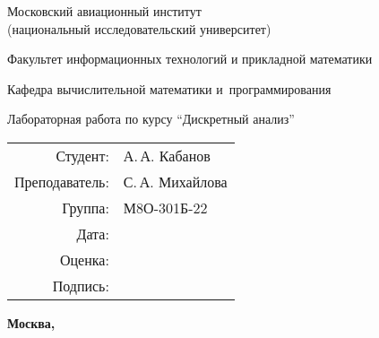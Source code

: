 \begin{titlepage}
	\begin{center}
		\bfseries
		
		{\Large Московский авиационный институт\\ (национальный исследовательский университет)
			
		}
		
		\vspace{48pt}
		
		{\large Факультет информационных технологий и прикладной математики
		}
		
		\vspace{36pt}
		
		{\large Кафедра вычислительной математики и~программирования
			
		}
		
		
		\vspace{48pt}
		
		Лабораторная работа  по курсу \enquote{Дискретный анализ}
		
	\end{center}
	
	\vspace{72pt}
	
	\begin{flushright}
		\begin{tabular}{rl}
			Студент: & А.\,А. Кабанов \\
			Преподаватель: & С.\,А. Михайлова \\
			Группа: & М8О-301Б-22 \\
			Дата: & \\
			Оценка: & \\
			Подпись: & \\
		\end{tabular}
	\end{flushright}
	
	\vfill
	
	\begin{center}
		\bfseries
		Москва, \the\year
	\end{center}
\end{titlepage}

\pagebreak
